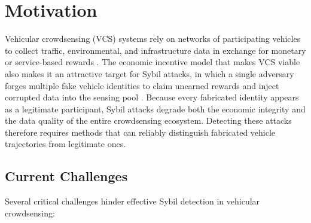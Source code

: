 \documentclass[12pt]{article}
\begin{document}
\endgroup

\section{Motivation}\label{sec:motivation}

Vehicular crowdsensing (VCS) systems rely on networks of participating vehicles to collect traffic, environmental, and infrastructure data in exchange for monetary or service-based rewards \cite{wang2022imitation}. The economic incentive model that makes VCS viable also makes it an attractive target for Sybil attacks, in which a single adversary forges multiple fake vehicle identities to claim unearned rewards and inject corrupted data into the sensing pool \cite{douceur2002sybil}. Because every fabricated identity appears as a legitimate participant, Sybil attacks degrade both the economic integrity and the data quality of the entire crowdsensing ecosystem. Detecting these attacks therefore requires methods that can reliably distinguish fabricated vehicle trajectories from legitimate ones.

\subsection{Current Challenges}

Several critical challenges hinder effective Sybil detection in vehicular crowdsensing:
\end{document}
